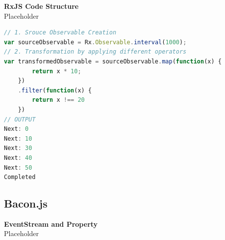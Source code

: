 \textbf{RxJS Code Structure}\\
Placeholder
\begin{lstlisting}[language=JavaScript, caption=RxJS Simple Example, label={lst:RxJS_Simple_Example}]
// 1. Srouce Observable Creation
var sourceObservable = Rx.Observable.interval(1000);
// 2. Transformation by applying different operators
var transformedObservable = sourceObservable.map(function(x) {
		return x * 10;
	})
	.filter(function(x) {
		return x !== 20
	})
// OUTPUT
Next: 0
Next: 10
Next: 30
Next: 40
Next: 50
Completed
\end{lstlisting}

\subsection{Bacon.js}

\textbf{EventStream and Property}\\
Placeholder

